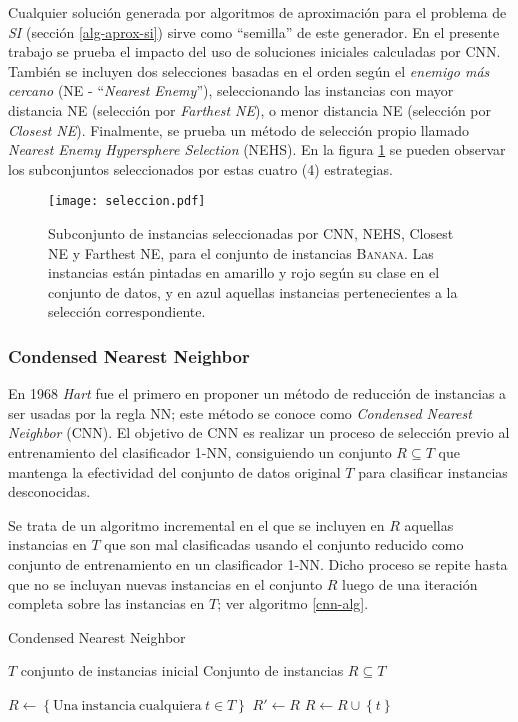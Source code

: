 Cualquier solución generada por algoritmos de aproximación para el problema de \emph{SI} (sección \ref{alg-aprox-si}) sirve como ``semilla'' de este generador. En el presente trabajo se prueba el impacto del uso de soluciones iniciales calculadas por CNN. También se incluyen dos selecciones basadas en el orden según el \emph{enemigo más cercano} (NE - ``\emph{Nearest Enemy}''), seleccionando las instancias con mayor distancia NE (selección por \emph{Farthest NE}), o menor distancia NE (selección por \emph{Closest NE}). Finalmente, se prueba un método de selección propio llamado \emph{Nearest Enemy Hypersphere Selection} (NEHS). En la figura \ref{seleccion} se pueden observar los subconjuntos seleccionados por estas cuatro (4) estrategias.

\begin{figure}[h!]
\centering
\texttt{[image: seleccion.pdf]}
\caption[Algoritmos de Selección de Instancias]{Subconjunto de instancias seleccionadas por CNN, NEHS, Closest NE y Farthest NE, para el conjunto de instancias \textsc{Banana}. Las instancias están pintadas en amarillo y rojo según su clase en el conjunto de datos, y en azul aquellas instancias pertenecientes a la selección correspondiente.}
\label{seleccion}
\end{figure}

\subsubsection{Condensed Nearest Neighbor}

En 1968 \emph{Hart} \cite{Hart:2006:CNN:2263267.2267647} fue el primero en proponer un método de reducción de instancias a ser usadas por la regla NN; este método se conoce como \emph{Condensed Nearest Neighbor} (CNN). El objetivo de CNN es realizar un proceso de selección previo al entrenamiento del clasificador 1-NN, consiguiendo un conjunto $R \subseteq T$ que mantenga la efectividad del conjunto de datos original $T$ para clasificar instancias desconocidas.

Se trata de un algoritmo incremental en el que se incluyen en $R$ aquellas instancias en $T$ que son mal clasificadas usando el conjunto reducido como conjunto de entrenamiento en un clasificador 1-NN. Dicho proceso se repite hasta que no se incluyan nuevas instancias en el conjunto $R$ luego de una iteración completa sobre las instancias en $T$; ver algoritmo \ref{cnn-alg}.

\begin{algorithm}
\caption{Condensed Nearest Neighbor}
\label{cnn-alg}
\begin{algorithmic}[1]

\Require $T$ conjunto de instancias inicial
\Ensure Conjunto de instancias $R \subseteq T$

\State $R \gets \left\lbrace \mathrm{Una\ instancia\ cualquiera}\ t \in T \right\rbrace$
\Repeat
	\State $R' \gets R$
			\State $R \gets R \cup \left\lbrace t \right\rbrace$
		\EndIf
	\EndFor
{}
\State {}
\end{algorithmic}
\end{algorithm}

